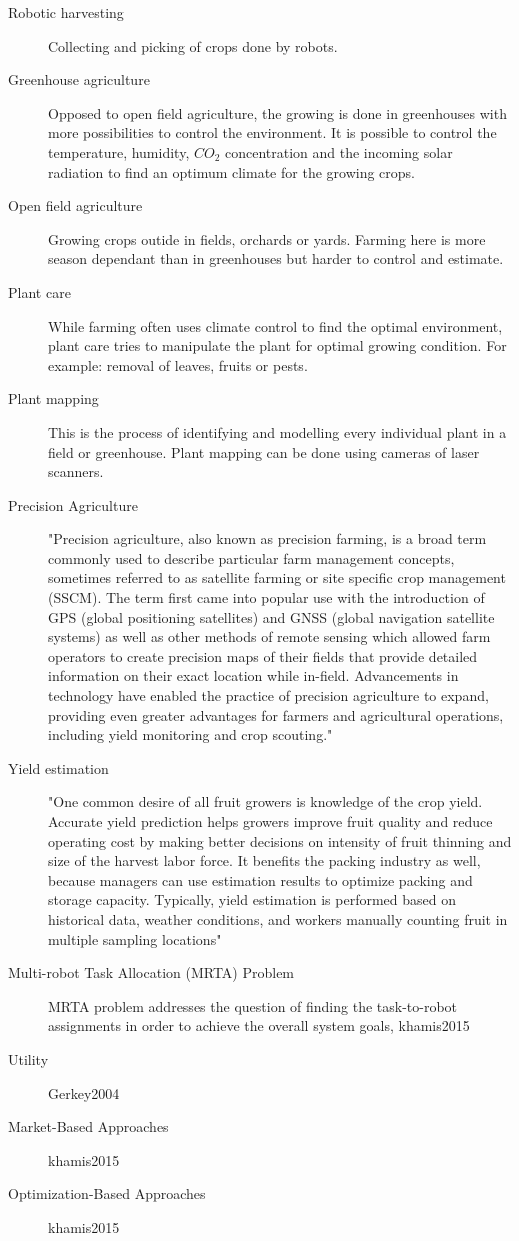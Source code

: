 \documentclass{article}
\begin{document}
\begin{description}
    \item[Robotic harvesting] Collecting and picking of crops done by robots.
    \item[Greenhouse agriculture] Opposed to open field agriculture, the growing is done in greenhouses with more possibilities to control the environment. It is possible to control the temperature, humidity, $CO_2$ concentration and the incoming solar radiation to find an optimum climate for the growing crops.
    \item[Open field agriculture] Growing crops outide in fields, orchards or yards. Farming here is more season dependant than in greenhouses but harder to control and estimate.
    \item[Plant care] While farming often uses climate control to find the optimal environment, plant care tries to manipulate the plant for optimal growing condition. For example: removal of leaves, fruits or pests.
    \item[Plant mapping] This is the process of identifying and modelling every individual plant in a field or greenhouse. Plant mapping can be done using cameras of laser scanners. 
    \item[Precision Agriculture] "Precision agriculture, also known as precision farming, is a broad term commonly used to describe particular farm management concepts, sometimes referred to as satellite farming or site specific crop management (SSCM). The term first came into popular use with the introduction of GPS (global positioning satellites) and GNSS (global navigation satellite systems) as well as other methods of remote sensing which allowed farm operators to create precision maps of their fields that provide detailed information on their exact location while in-field. Advancements in technology have enabled the practice of precision agriculture to expand, providing even greater advantages for farmers and agricultural operations, including yield monitoring and crop scouting." \cite{Farms2020}
    \item[Yield estimation] "One common desire of all fruit growers is knowledge of the crop yield. Accurate yield prediction helps growers improve fruit quality and reduce operating cost by making better decisions on intensity of fruit thinning and size of the harvest labor force. It benefits the packing industry as well, because managers can use estimation results to optimize packing and storage capacity. Typically, yield estimation is performed based on historical data, weather conditions, and workers manually counting fruit in multiple sampling locations" \cite{Siciliano2016}
    \item[Multi-robot Task Allocation (MRTA) Problem] MRTA problem addresses the question of finding the task-to-robot assignments in order to achieve the overall system goals, khamis2015
    \item[Utility] Gerkey2004
    \item[Market-Based Approaches] khamis2015
    \item[Optimization-Based Approaches] khamis2015 
\end{description}

\newpage


\end{document}
